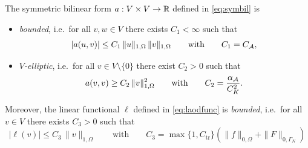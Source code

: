\begin{proposition}\label{pr:aproperties}
	The symmetric bilinear form $a:V\times V\to {\mathbb R}$ defined in \eqref{eq:symbil} is
	\begin{itemize}
		\item[i)] {\em bounded}, i.e.\ for all $v,w\in V$ there exists $C_1<\infty$ such that
		      \begin{equation*}
			      |a(u,v)|\le C_1\,\|u\|_{1,\Omega}\,\|v\|_{1,\Omega}\qquad \text{with}\qquad C_1 = C_{\mathcal A},
		      \end{equation*}
		\item[ii)] $V${\em -elliptic}, i.e.\ for all $v\in V\setminus\{0\}$ there exist $C_2>0$ such that
		      \begin{equation*}
			      a(v,v)\ge C_2\,\|v\|_{1,\Omega}^2\qquad\text{with}\qquad C_2 = \frac{\alpha_{\mathcal A}}{C_K^2}.
		      \end{equation*}
	\end{itemize}
	Moreover, the linear functional $\ell$ defined in \eqref{eq:laodfunc} is {\em bounded}, i.e.\ for all $v\in V$ there exists $C_3>0$ such that
	\begin{equation}\label{eq:ellbound}
		|\ell (v)|\le C_3\,\|v\|_{1,\Omega}\qquad\text{with}\qquad C_3 = \max\{1,C_\mathrm{tr}\}\left(\|f\|_{0,\Omega}+\|F\|_{0,\Gamma_N}\right)
	\end{equation}
\end{proposition}
